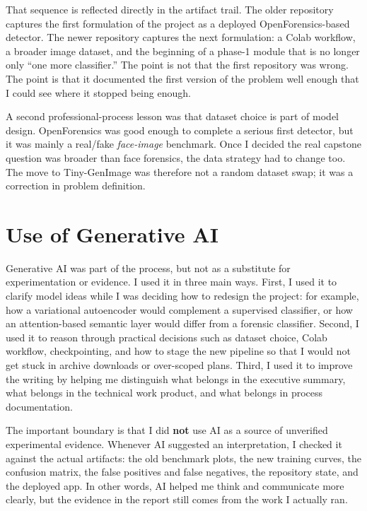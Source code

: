 \documentclass[11pt]{article}
\begin{document}
That sequence is reflected directly in the artifact trail. The older repository captures the first formulation of the project as a deployed OpenForensics-based detector. The newer repository captures the next formulation: a Colab workflow, a broader image dataset, and the beginning of a phase-1 module that is no longer only ``one more classifier.'' The point is not that the first repository was wrong. The point is that it documented the first version of the problem well enough that I could see where it stopped being enough.

A second professional-process lesson was that dataset choice is part of model design. OpenForensics was good enough to complete a serious first detector, but it was mainly a real/fake \emph{face-image} benchmark. Once I decided the real capstone question was broader than face forensics, the data strategy had to change too. The move to Tiny-GenImage was therefore not a random dataset swap; it was a correction in problem definition.

\section{Use of Generative AI}

Generative AI was part of the process, but not as a substitute for experimentation or evidence. I used it in three main ways. First, I used it to clarify model ideas while I was deciding how to redesign the project: for example, how a variational autoencoder would complement a supervised classifier, or how an attention-based semantic layer would differ from a forensic classifier. Second, I used it to reason through practical decisions such as dataset choice, Colab workflow, checkpointing, and how to stage the new pipeline so that I would not get stuck in archive downloads or over-scoped plans. Third, I used it to improve the writing by helping me distinguish what belongs in the executive summary, what belongs in the technical work product, and what belongs in process documentation.

The important boundary is that I did \textbf{not} use AI as a source of unverified experimental evidence. Whenever AI suggested an interpretation, I checked it against the actual artifacts: the old benchmark plots, the new training curves, the confusion matrix, the false positives and false negatives, the repository state, and the deployed app. In other words, AI helped me think and communicate more clearly, but the evidence in the report still comes from the work I actually ran.
\end{document}

